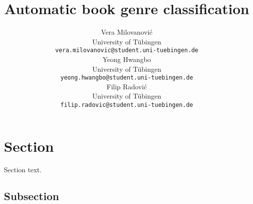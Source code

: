 \documentclass{article}
\title{Automatic book genre classification}
\author{%
  Vera Milovanović\\
  University of Tübingen\\
  \texttt{vera.milovanovic@student.uni-tuebingen.de} \\
  \And
  Yeong Hwangbo\\
  University of Tübingen\\
  \texttt{yeong.hwangbo@student.uni-tuebingen.de} \\
  \And
  Filip Radović\\
  University of Tübingen\\
  \texttt{filip.radovic@student.uni-tuebingen.de}\\
}
\begin{document}
\maketitle


\begin{abstract}
  
\end{abstract}


\section{Section}

Section text.

\subsection{Subsection}
\end{document}
